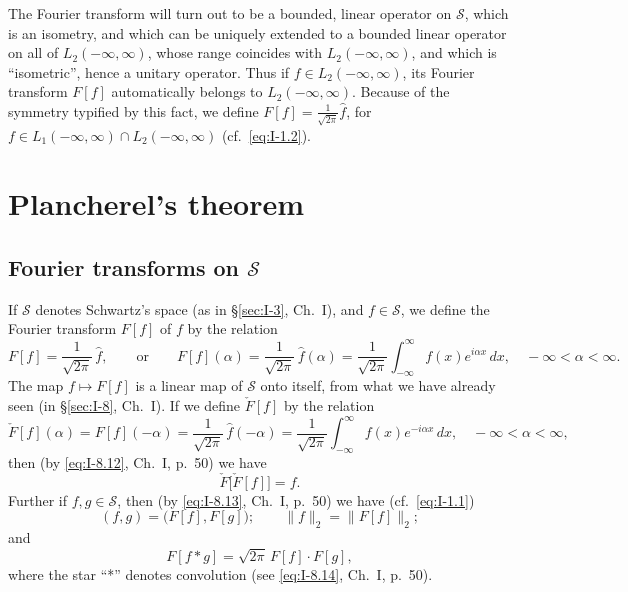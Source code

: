 The Fourier transform will turn out to be a bounded, linear operator on $\mathcal S$, which is an isometry, and which can be uniquely extended to a bounded linear operator on all of $L_{2}(-\infty,\infty)$, whose range coincides with $L_{2}(-\infty,\infty)$, and which is ``isometric'', hence a unitary operator. Thus if $f\in L_{2}(-\infty,\infty)$, its Fourier transform $F[f]$ automatically belongs to $L_{2}(-\infty,\infty)$. Because of the symmetry typified by this fact, we define $F[f]=\frac{1}{\sqrt{2\pi}}\hat f$, for $f\in L_{1}(-\infty,\infty)\cap L_{2}(-\infty,\infty)$ (cf.\ \eqref{eq:I-1.2}).

\section{Plancherel's theorem}
\label{sec:II-2}

\subsection*{Fourier transforms on $\mathcal S$}
\noindent If $\mathcal S$ denotes Schwartz's space (as in \S\ref{sec:I-3}, Ch.~I), and $f\in\mathcal S$, we define the Fourier transform $F[f]$ of $f$ by the relation
\begin{equation}\tag{2.1}\label{eq:II-2.1}
F[f]=\frac{1}{\sqrt{2\pi}}\,\hat f,\qquad\text{or}\qquad
F[f](\alpha)=\frac{1}{\sqrt{2\pi}}\,\hat f(\alpha)
=\frac{1}{\sqrt{2\pi}}\int_{-\infty}^{\infty}f(x)e^{i\alpha x}\,dx,\quad-\infty<\alpha<\infty.
\end{equation}
The map $f\mapsto F[f]$ is a linear map of $\mathcal S$ onto itself, from what we have already seen (in \S\ref{sec:I-8}, Ch.~I). If we define $\check F[f]$ by the relation
\begin{equation}\tag{2.2}\label{eq:II-2.2}
\check F[f](\alpha)=F[f](-\alpha)=\frac{1}{\sqrt{2\pi}}\,\hat f(-\alpha)
=\frac{1}{\sqrt{2\pi}}\int_{-\infty}^{\infty}f(x)e^{-i\alpha x}\,dx,\quad-\infty<\alpha<\infty,
\end{equation}
then (by \eqref{eq:I-8.12}, Ch.~I, p.~50) we have
\begin{equation}\tag{2.3}\label{eq:II-2.3}
\check F\bigl[\check F[f]\bigr]=f.
\end{equation}
Further if $f,g\in\mathcal S$, then (by \eqref{eq:I-8.13}, Ch.~I, p.~50) we have (cf.\ \eqref{eq:I-1.1})
\begin{equation}\tag{2.4}\label{eq:II-2.4}
(f,g)=\bigl(F[f],F[g]\bigr);\qquad \|f\|_{2}=\|F[f]\|_{2};
\end{equation}
and
\begin{equation}\tag{2.5}\label{eq:II-2.5}
F[f*g]=\sqrt{2\pi}\,F[f]\cdot F[g],
\end{equation}
where the star ``*'' denotes convolution (see \eqref{eq:I-8.14}, Ch.~I, p.~50).

